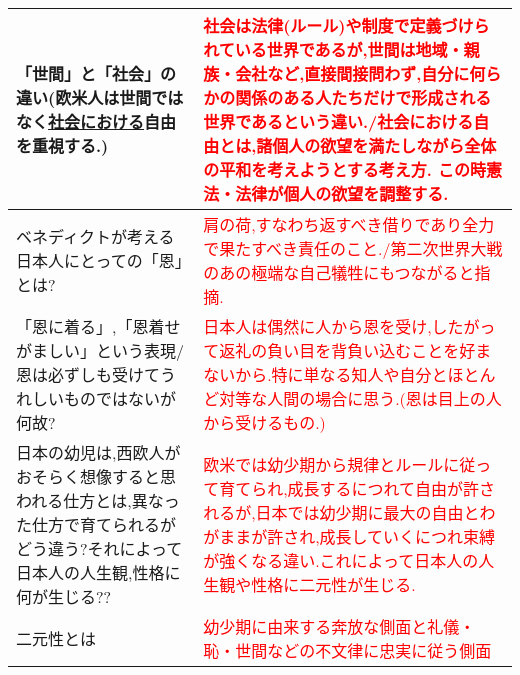 \documentclass[a4paper,10pt]{article}
\begin{document}
\begin{longtable}{|p{}|p{}|}
    「世間」と「社会」の違い(欧米人は世間ではなく\underline{社会における}自由を重視する.) & \textcolor{red}{社会は法律(ルール)や制度で定義づけられている世界であるが,世間は地域・親族・会社など,直接間接問わず,自分に何らかの関係のある人たちだけで形成される世界であるという違い./社会における自由とは,諸個人の欲望を満たしながら全体の平和を考えようとする考え方. この時憲法・法律が個人の欲望を調整する.} \\ \hline
    ベネディクトが考える日本人にとっての「恩」とは? & \textcolor{red}{肩の荷,すなわち返すべき借りであり全力で果たすべき責任のこと./第二次世界大戦のあの極端な自己犠牲にもつながると指摘.} \\ \hline
    「恩に着る」,「恩着せがましい」という表現/恩は必ずしも受けてうれしいものではないが何故?& \textcolor{red}{日本人は偶然に人から恩を受け,したがって返礼の負い目を背負い込むことを好まないから.特に単なる知人や自分とほとんど対等な人間の場合に思う.(恩は目上の人から受けるもの.)} \\ \hline
    日本の幼児は,西欧人がおそらく想像すると思われる仕方とは,異なった仕方で育てられるがどう違う?それによって日本人の人生観,性格に何が生じる?? & \textcolor{red}{欧米では幼少期から規律とルールに従って育てられ,成長するにつれて自由が許されるが,日本では幼少期に最大の自由とわがままが許され,成長していくにつれ束縛が強くなる違い.これによって日本人の人生観や性格に二元性が生じる.} \\ \hline
    二元性とは & \textcolor{red}{幼少期に由来する奔放な側面と礼儀・恥・世間などの不文律に忠実に従う側面} \\ \hline
\end{longtable}
\end{document}
